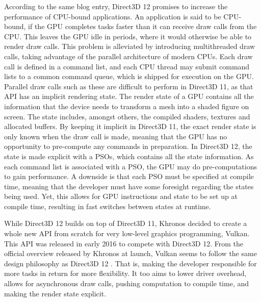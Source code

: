 According to the same blog entry, Direct3D 12 promises to increase the performance of CPU-bound applications.
An application is said to be \gls{CPU}-bound, if the \gls{GPU} completes tasks faster than it can receive draw calls from the \gls{CPU}.
This leaves the \gls{GPU} idle in periods, where it would otherwise be able to render draw calls.
This problem is alleviated by introducing multithreaded draw calls, taking advantage of the parallel architecture of modern \glspl{CPU}.
Each draw call is defined in a command list, and each \gls{CPU} thread may submit command lists to a common command queue, which is shipped for execution on the \gls{GPU}.
Parallel draw calls such as these are difficult to perform in Direct3D 11, as that \gls{API} has an implicit rendering state.
The render state of a \gls{GPU} contains all the information that the device needs to transform a mesh into a shaded figure on screen.
The state includes, amongst others, the compiled shaders, textures and allocated buffers.
By keeping it implicit in Direct3D 11, the exact render state is only known when the draw call is made, meaning that the \gls{GPU} has no opportunity to pre-compute any commands in preparation.
In Direct3D 12, the state is made explicit with a \glspl{PSO}, which contains all the state information.
As each command list is associated with a \gls{PSO}, the \gls{GPU} may do pre-computations to gain performance.
A downside is that each \gls{PSO} must be specified at compile time, meaning that the developer must have some foresight regarding the states being used.
Yet, this allows for \gls{GPU} instructions and state to be set up at compile time, resulting in fast switches between states at runtime.  

While Direct3D 12 builds on top of Direct3D 11, Khronos decided to create a whole new \gls{API} from scratch for very low-level graphics programming, Vulkan.
This \gls{API} was released in early 2016 to compete with Direct3D 12.
From the official overview released by Khronos at launch, Vulkan seems to follow the same design philosophy as Direct3D 12 \cite{vulkanPresentationFeb2016}.
That is, making the developer responsible for more tasks in return for more flexibility.
It too aims to lower driver overhead, allows for asynchronous draw calls, pushing computation to compile time, and making the render state explicit.

